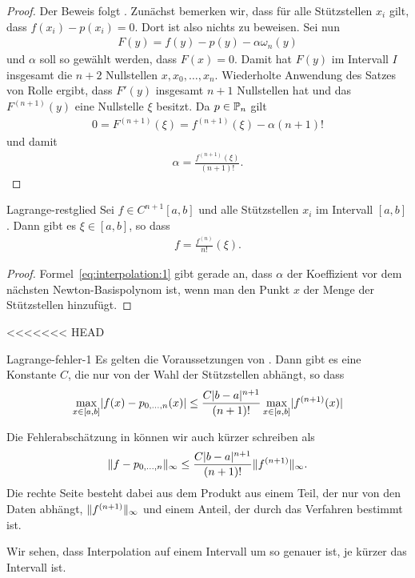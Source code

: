 \begin{proof}
  Der Beweis folgt \cite[Satz 2.1.4.1]{Stoer83}.  Zunächst bemerken
  wir, dass für alle Stützstellen $x_i$ gilt, dass
  $f(x_i) - p(x_i) = 0$. Dort ist also nichts zu beweisen.
  Sei nun
  \begin{gather}
    \label{eq:interpolation:1}
    F(y) = f(y)-p(y) - \alpha \omega_n(y)
  \end{gather}
  und $\alpha$ soll so gewählt werden, dass $F(x) = 0$. Damit hat $F(y)$ im
  Intervall $I$ insgesamt die $n+2$ Nullstellen $x,x_0,\dots,x_n$.
  Wiederholte Anwendung des Satzes von Rolle ergibt, dass $F'(y)$
  insgesamt $n+1$ Nullstellen hat und das $F^{(n+1)}(y)$ eine
  Nullstelle $\xi$ besitzt. Da $p\in \P_n$ gilt
  \begin{gather}
    0 = F^{(n+1)}(\xi) = f^{(n+1)}(\xi) - \alpha (n+1)!
  \end{gather}
  und damit
  \begin{gather}
    \alpha = \frac{f^{(n+1)}(\xi)}{(n+1)!}.
  \end{gather}
\end{proof}

\begin{Korollar}{Lagrange-restglied}
  Sei $f \in C^{n+1}[a,b]$ und alle Stützstellen $x_i$ im Intervall
  $[a,b]$. Dann gibt es $\xi\in[a,b]$, so dass
  \begin{gather}
    [x_0,\dots,x_n]f = \frac{f^{(n)}}{n!}(\xi).
  \end{gather}
\end{Korollar}

\begin{proof}
  Formel~\eqref{eq:interpolation:1} gibt gerade an, dass $\alpha$ der
  Koeffizient vor dem nächsten Newton-Basispolynom ist, wenn man den
  Punkt $x$ der Menge der Stützstellen hinzufügt.
\end{proof}

<<<<<<< HEAD
\begin{Korollar}{Lagrange-fehler-1}
  Es gelten die Voraussetzungen von
  . Dann gibt es eine Konstante
  $C$, die nur von der Wahl der Stützstellen abhängt, so dass
  \begin{gather}
    \max_{x\in[a,b]} \abs{f(x)-p_{0,\dots,n}(x)}
    \le \frac{C \abs{b-a}^{n+1}}{(n+1)!} \max_{x\in[a,b]} \abs{f^{(n+1)}(x)} 
  \end{gather}
\end{Korollar}

\begin{remark}
  Die Fehlerabschätzung in 
  können wir auch kürzer schreiben als
  \begin{gather}
    \norm{f-p_{0,\dots,n}}_\infty \le \frac{C \abs{b-a}^{n+1}}{(n+1)!}
    \norm{f^{(n+1)}}_{\infty}.
  \end{gather}
  Die rechte Seite besteht dabei aus dem Produkt aus einem Teil, der
  nur von den Daten abhängt, $\norm{f^{(n+1)}}_{\infty}$ und einem
  Anteil, der durch das Verfahren bestimmt ist.

  Wir sehen, dass Interpolation auf einem Intervall um so genauer ist,
  je kürzer das Intervall ist.
\end{remark}

